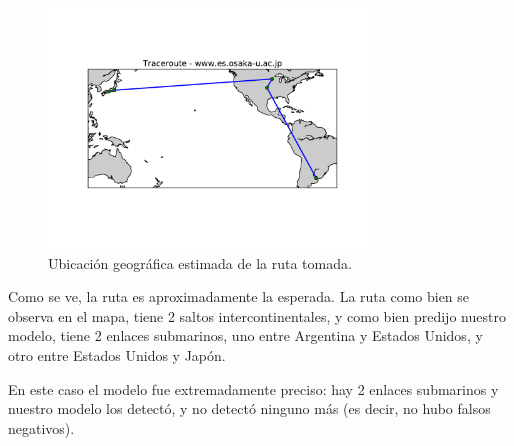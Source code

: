 \begin{figure}[H]
    \centering
    \includegraphics[width=8.5cm]{img/grafico3-www-es-osaka-u-ac-jp.pdf}
    \caption{\normalfont Ubicación geográfica estimada de la ruta tomada.}
\end{figure}


Como se ve, la ruta es aproximadamente la esperada. La ruta como bien se observa en el mapa, tiene 2 saltos intercontinentales, y como bien predijo nuestro modelo, tiene 2 enlaces submarinos, uno entre Argentina y Estados Unidos, y otro entre Estados Unidos y Japón.

En este caso el modelo fue extremadamente preciso: hay 2 enlaces submarinos y nuestro modelo los detectó, y no detectó ninguno más (es decir, no hubo falsos negativos).



